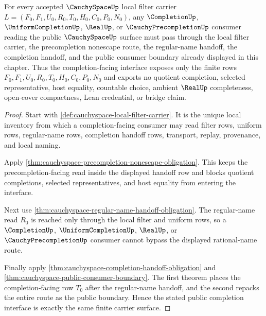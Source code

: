 \begin{theorem}
\label{thm:cauchyspace-public-completion-interface}
For every accepted $\CauchySpaceUp$ local filter carrier $L=(F_0,F_1,U_0,R_0,T_0,H_0,C_0,P_0,N_0)$, any $\CompletionUp$, $\UniformCompletionUp$, $\RealUp$, or $\CauchyPrecompletionUp$ consumer reading the public $\CauchySpaceUp$ surface must pass through the local filter carrier, the precompletion nonescape route, the regular-name handoff, the completion handoff, and the public consumer boundary already displayed in this chapter. Thus the completion-facing interface exposes only the finite rows $F_0,F_1,U_0,R_0,T_0,H_0,C_0,P_0,N_0$ and exports no quotient completion, selected representative, host equality, countable choice, ambient $\RealUp$ completeness, open-cover compactness, Lean credential, or bridge claim.
\end{theorem}
\begin{proof}
Start with \autoref{def:cauchyspace-local-filter-carrier}. It is the unique local inventory from which a completion-facing consumer may read filter rows, uniform rows, regular-name rows, completion handoff rows, transport, replay, provenance, and local naming.

Apply \autoref{thm:cauchyspace-precompletion-nonescape-obligation}. This keeps the precompletion-facing read inside the displayed handoff row and blocks quotient completions, selected representatives, and host equality from entering the interface.

Next use \autoref{thm:cauchyspace-regular-name-handoff-obligation}. The regular-name read $R_0$ is reached only through the local filter and uniform rows, so a $\CompletionUp$, $\UniformCompletionUp$, $\RealUp$, or $\CauchyPrecompletionUp$ consumer cannot bypass the displayed rational-name route.

Finally apply \autoref{thm:cauchyspace-completion-handoff-obligation} and \autoref{thm:cauchyspace-public-consumer-boundary}. The first theorem places the completion-facing row $T_0$ after the regular-name handoff, and the second repacks the entire route as the public boundary. Hence the stated public completion interface is exactly the same finite carrier surface.
\end{proof}


